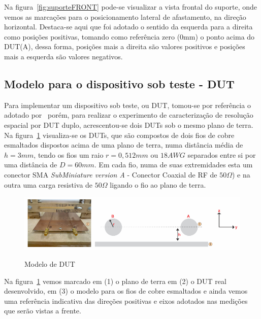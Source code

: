 Na figura~\ref{fig:suporteFRONT} pode-se visualizar a vista frontal do suporte, onde vemos as marcações para o posicionamento lateral de afastamento, na direção horizontal. Destaca-se aqui que foi adotado o sentido da esquerda para a direita como posições positivas, tomando como referência zero (0mm) o ponto acima do DUT(A), dessa forma, posições mais a direita são valores positivos e posições mais a esquerda são valores negativos.

\subsection{Modelo para o dispositivo sob teste - DUT}
Para implementar um dispositivo sob teste, ou DUT, tomou-se por referência o adotado por~ porém, para realizar o experimento de caracterização de resolução espacial por DUT duplo, acrescentou-se dois DUTs sob o mesmo plano de terra. Na figura~\ref{fig:esquema3_fundo} visualiza-se os DUTs, que são compostos de dois fios de cobre esmaltados dispostos acima de uma plano de terra, numa distância média de $h = 3mm$, tendo os fios um raio $r = 0,512mm$ ou $18AWG$ separados entre si por uma distância de $D = 60mm$. Em cada fio, numa de suas extremidades esta um conector SMA \textit{SubMiniature version A} - Conector Coaxial de RF de $50\Omega$) e na outra uma carga resistiva de $50\Omega$ ligando o fio ao plano de terra.

\begin{figure}[htb!]
	\centering 
	\caption{Modelo de DUT}
	\includegraphics[scale=2.4]{./img/esquema3_fundo}
	\label{fig:esquema3_fundo}
\end{figure}

Na figura~\ref{fig:esquema3_fundo} vemos marcado em (1) o plano de terra em (2) o DUT real desenvolvido, em (3) o modelo para os fios de cobre esmaltados e ainda vemos uma referência indicativa das direções positivas e eixos adotados nas medições que serão vistas a frente.


